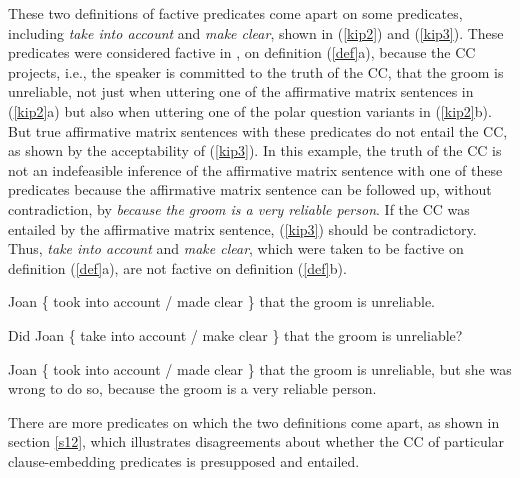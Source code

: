 \documentclass[11pt,fleqn]{article}
\newcommand{\6}{\mbox{$[\hspace*{-.6mm}[$}}
\newcommand{\9}{\mbox{$]\hspace*{-.6mm}]$}}
\begin{document}
%
%


These two definitions of factive predicates come apart on some predicates, including {\em take into account} and {\em make clear}, shown in (\ref{kip2}) and (\ref{kip3}). These predicates were considered factive in \citealt{kiparsky-kiparsky70}, on definition (\ref{def}a), because the CC projects, i.e., the speaker is committed to the truth of the CC, that the groom is unreliable, not just when uttering one of the affirmative matrix sentences in (\ref{kip2}a) but also when uttering one of the polar question variants in (\ref{kip2}b). But true affirmative matrix sentences with these predicates do not entail the CC, as shown by the acceptability of (\ref{kip3}). In this example, the truth of the CC is not an indefeasible inference of the affirmative matrix sentence with one of these predicates because the affirmative matrix sentence can be followed up, without contradiction, by {\em because the groom is a very reliable person}. If the CC was entailed by the affirmative matrix sentence, (\ref{kip3}) should be contradictory. Thus, {\em take into account} and {\em make clear}, which were taken to be factive on definition (\ref{def}a), are not factive on definition (\ref{def}b).

\begin{exe}
\ex\label{kip2}
\begin{xlist}
\ex Joan  \{ took into account /  made clear \}  that the groom is unreliable.

\ex Did Joan \{ take into account / make clear \} that the groom is unreliable?
\end{xlist}
\ex\label{kip3} Joan  \{ took into account / made clear \} that the groom is unreliable, but she was wrong to do so, because the groom is a very reliable person.
\end{exe}
There are more predicates on which the two definitions come apart, as shown in section \ref{s12}, which illustrates disagreements about whether the CC of particular clause-embedding predicates is presupposed and entailed.
\end{document}
